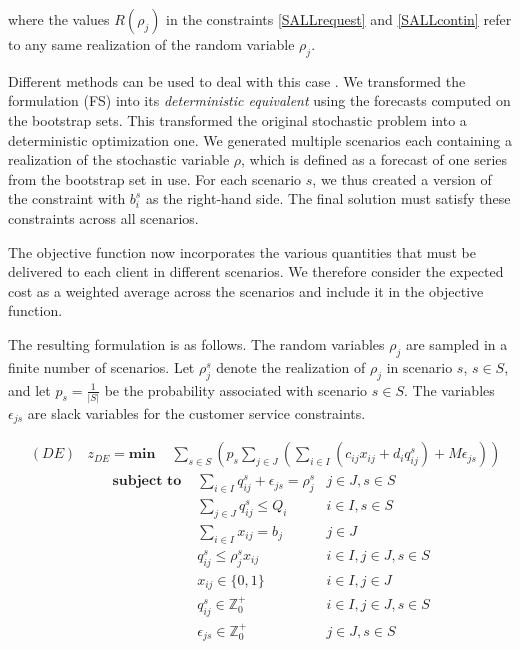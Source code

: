 \documentclass[opre,sglanonrev,11pt]{informs4}
\begin{document}
\noindent where the values $R(\rho_j)$ in the constraints \ref{SALLrequest} and \ref{SALLcontin} refer to any same realization of the random variable $\rho_j$.

Different methods can be used to deal with this case \citep{SDR09}. We transformed the formulation (FS) into its {\it deterministic equivalent} \citep{D55} using the forecasts computed on the bootstrap sets. This transformed the original stochastic problem into a deterministic optimization one. We generated multiple scenarios each containing a realization of the stochastic variable $\rho$, which is defined as a forecast of one series from the bootstrap set in use. For each scenario $s$, we thus created a version of the constraint with $b_i^{s}$ as the right-hand side. The final solution must satisfy these constraints across all scenarios.

The objective function now incorporates the various quantities that must be delivered to each client in different scenarios. We therefore consider the expected cost as a weighted average across the scenarios and include it in the objective function. 

The resulting formulation is as follows. The random variables $\rho_j$ are sampled in a finite number of scenarios. Let $\rho^s_j$ denote the realization of $\rho_j$ in scenario $s$, $s \in S$, and let $p_s = \frac{1}{|S|}$ be the probability associated with scenario $s \in S$. The variables $\epsilon_{js}$ are slack variables for the customer service constraints.

\begin{align}
	&(DE) & z_{DE} = \textbf{min } & \sum_{s \in S} \left( p_s \sum_{j \in J} \left( \sum_{i \in I} ( c_{ij}x_{ij} + d_i q_{ij}^s) + M \epsilon_{js} \right) \right) \label{DEobj}
\end{align}
\begin{align}
	& &  \textbf{subject to }
	& \sum_{i \in I} q_{ij}^s + \epsilon_{js} = \rho_j^s & j \in J, s \in S \label{DErequest}\\
	& &  & \sum_{j \in J}q_{ij}^s \leq Q_i & i \in I, s \in S \label{DEcapacity}\\
	& &  & \sum_{i \in I} x_{ij} = b_j & j \in J  \label{DEnumserv}\\
	& &  & q_{ij}^s \leq \rho_j^s x_{ij} & i \in I, j \in J, s \in S \label{DEcontin}\\
	& &  & x_{ij} \in \{0,1\} & i\in I, j \in J \label{DEx}\\
	& &  & q_{ij}^s \in \mathbb{Z}^+_0 & i\in I, j \in J, s \in S \label{DEq}\\
	& &  & \epsilon_{js} \in \mathbb{Z}^+_0 & j \in J, s \in S \label{DEeps}
\end{align}
\end{document}
